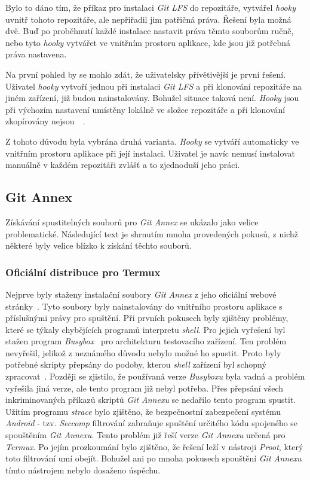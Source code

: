     Bylo to dáno tím, že příkaz pro instalaci \emph{Git LFS} do repozitáře, vytvářel \emph{hooky} uvnitř tohoto repozitáře, ale nepřiřadil jim patřičná práva. Řešení byla možná dvě. Buď po proběhnutí každé instalace nastavit práva těmto souborům ručně, nebo tyto \emph{hooky} vytvářet ve vnitřním prostoru aplikace, kde jsou již potřebná práva nastavena.
    
    Na první pohled by se mohlo zdát, že uživatelsky přívětivější je první řešení. Uživatel \emph{hooky} vytvoří jednou při instalaci \emph{Git LFS} a při klonování repozitáře na jiném zařízení, již budou nainstalovány. Bohužel situace taková není. \emph{Hooky} jsou při výchozím nastavení umístěny lokálně ve složce  repozitáře a při klonování zkopírovány nejsou~~.

    Z tohoto důvodu byla vybrána druhá varianta. \emph{Hooky} se vytváří automaticky ve vnitřním prostoru aplikace při její instalaci. Uživatel je navíc nemusí instalovat manuálně v každém repozitáři zvlášť a to zjednoduší jeho práci.

    \newpage
    \subsection{Git Annex}\label{sec:problemy_annex}
    Získávání spustitelných souborů pro \emph{Git Annex} se ukázalo jako velice problematické. Následující text je shrnutím mnoha provedených pokusů, z nichž některé byly velice blízko k získání těchto souborů.

    \subsubsection{Oficiální distribuce pro Termux}
    Nejprve byly staženy instalační soubory \emph{Git Annex} z jeho oficiální webové stránky~. Tyto soubory byly nainstalovány do vnitřního prostoru aplikace s příslušnými právy pro spuštění. Při prvních pokusech byly zjištěny problémy, které se týkaly chybějících programů interpretu \emph{shell}. Pro jejich vyřešení byl stažen program \emph{Busybox}~ pro architekturu testovacího zařízení. Ten problém nevyřešil, jelikož z neznámého důvodu nebylo možné ho spustit. Proto byly potřebné skripty přepsány do podoby, kterou \emph{shell} zařízení byl schopný zpracovat~\label{annex_skripts_overwrite}. Později se zjistilo, že používaná verze \emph{Busyboxu} byla vadná a problém vyřešila jiná verze, ale tento program již nebyl potřeba. Přes přepsání všech inkriminovaných příkazů skriptů \emph{Git Annexu} se nedařilo tento program spustit. Užitím programu \emph{strace} bylo zjištěno, že bezpečnostní zabezpečení systému \emph{Android} - tzv. \emph{Seccomp} filtrování zabraňuje spuštění určitého kódu spojeného se spouštěním \emph{Git Annexu}. Tento problém již řeší verze \emph{Git Annexu} určená pro \emph{Termux}. Po jejím prozkoumání bylo zjištěno, že řešení leží v nástroji \emph{Proot}, který toto filtrování umí obejít. Bohužel ani po mnoha pokusech spouštění \emph{Git Annexu} tímto nástrojem nebylo dosaženo úspěchu.

